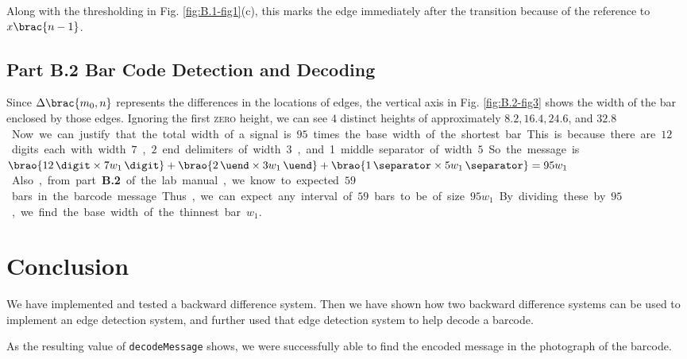 \documentclass[conference]{../lib/IEEEtran}
\DeclarePairedDelimiter\brao()%
\DeclarePairedDelimiter\brac[]%
\begin{document}
Along with the thresholding in Fig. \ref{fig:B.1-fig1}(c), this marks the edge immediately after the transition because of the reference to \(x\brac{n - 1}\).

\subsection{Part B.2 Bar Code Detection and Decoding}

Since \(\Delta\brac{m_0, n}\) represents the differences in the locations of edges, the vertical axis in Fig. \ref{fig:B.2-fig3} shows the width of the bar enclosed by those edges. Ignoring the first \textsc{zero} height, we can see \(4\) distinct heights of approximately \(8.2, 16.4, 24.6\), and \(32.8\) \si\sample.

Now we can justify that the total width of a signal is \(95\) times the base width of the shortest bar. This is because there are \(12\) digits each with width \(7\), \(2\) end delimiters of width \(3\), and 1 middle separator of width \(5\). So the message is \(\brao{\SI{12}\digit \times \SI{7w_1}{\per\digit}} + \brao{\SI{2}\uend \times \SI{3w_1}{\per\uend}} + \brao{\SI{1}\separator \times \SI{5w_1}{\per\separator}} = 95w_1\). Also, from part \textbf{B.2} of the lab manual, we know to expected \(59\) bars in the barcode message. Thus, we can expect any interval of \(59\) bars to be of size \(95w_1\). By dividing these by \(95\), we find the base width of the thinnest bar \(w_1\).

\section{Conclusion}

We have implemented and tested a backward difference system. Then we have shown how two backward difference systems can be used to implement an edge detection system, and further used that edge detection system to help decode a barcode.

As the resulting value of \texttt{decodeMessage} shows, we were successfully able to find the encoded message in the photograph of the barcode.
\end{document}
